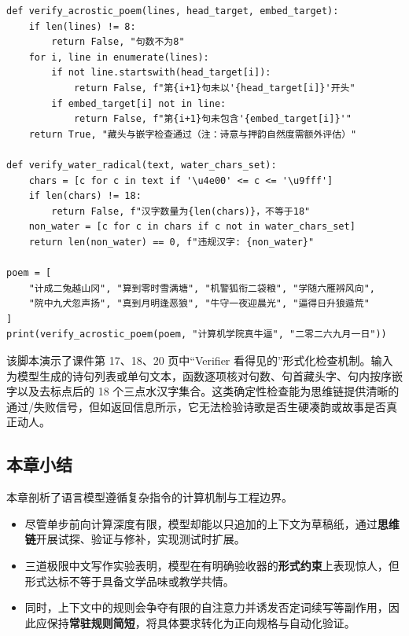 \documentclass[UTF8,a4paper,11pt,fontset=fandol]{ctexart}
\begin{document}
\begin{lstlisting}[basicstyle={\ttfamily\small\linespread{1}\selectfont},captionpos=t,caption={机械验收器（Verifier）示例：检查三道中文极限约束题的形式合规性}]
def verify_acrostic_poem(lines, head_target, embed_target):
    if len(lines) != 8:
        return False, "句数不为8"
    for i, line in enumerate(lines):
        if not line.startswith(head_target[i]):
            return False, f"第{i+1}句未以'{head_target[i]}'开头"
        if embed_target[i] not in line:
            return False, f"第{i+1}句未包含'{embed_target[i]}'"
    return True, "藏头与嵌字检查通过（注：诗意与押韵自然度需额外评估）"

def verify_water_radical(text, water_chars_set):
    chars = [c for c in text if '\u4e00' <= c <= '\u9fff']
    if len(chars) != 18:
        return False, f"汉字数量为{len(chars)}，不等于18"
    non_water = [c for c in chars if c not in water_chars_set]
    return len(non_water) == 0, f"违规汉字: {non_water}"

poem = [
    "计成二兔越山冈", "算到零时雪满塘", "机警狐衔二袋粮", "学随六雁辨风向",
    "院中九犬忽声扬", "真到月明逢恶狼", "牛守一夜迎晨光", "逼得日升狼遁荒"
]
print(verify_acrostic_poem(poem, "计算机学院真牛逼", "二零二六九月一日"))
\end{lstlisting}

该脚本演示了课件第 17、18、20 页中“Verifier 看得见的”形式化检查机制。输入为模型生成的诗句列表或单句文本，函数逐项核对句数、句首藏头字、句内按序嵌字以及去标点后的 18 个三点水汉字集合。这类确定性检查能为思维链提供清晰的通过/失败信号，但如返回信息所示，它无法检验诗歌是否生硬凑韵或故事是否真正动人。

\subsection{本章小结}

本章剖析了语言模型遵循复杂指令的计算机制与工程边界。

\begin{itemize}
\item 尽管单步前向计算深度有限，模型却能以只追加的上下文为草稿纸，通过\textbf{思维链}开展试探、验证与修补，实现测试时扩展。

\item 三道极限中文写作实验表明，模型在有明确验收器的\textbf{形式约束}上表现惊人，但形式达标不等于具备文学品味或教学共情。

\item 同时，上下文中的规则会争夺有限的自注意力并诱发否定词续写等副作用，因此应保持\textbf{常驻规则简短}，将具体要求转化为正向规格与自动化验证。
\end{itemize}
\end{document}
